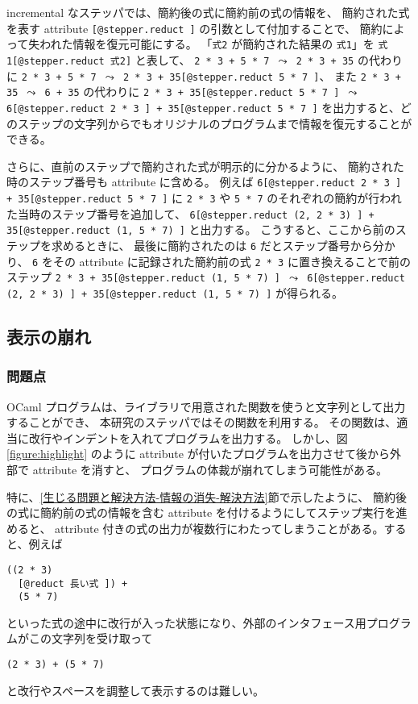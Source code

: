 incremental なステッパでは、簡約後の式に簡約前の式の情報を、
簡約された式を表す attribute \texttt{[@stepper.reduct ]} の引数として付加することで、
簡約によって失われた情報を復元可能にする。
「\texttt{式2} が簡約された結果の \texttt{式1}」を
\texttt{式1[@stepper.reduct 式2]} と表して、
\texttt{2 * 3 + 5 * 7 $\leadsto$ 2 * 3 + 35} の代わりに
\texttt{2 * 3 + 5 * 7 $\leadsto$ 2 * 3 + 35[@stepper.reduct 5 * 7 ]}、
また \texttt{2 * 3 + 35 $\leadsto$ 6 + 35} の代わりに
\texttt{2 * 3 + 35[@stepper.reduct 5 * 7 ] $\leadsto$ 6[@stepper.reduct 2 * 3 ] + 35[@stepper.reduct 5 * 7 ]}
を出力すると、どのステップの文字列からでもオリジナルのプログラムまで情報を復元することができる。

さらに、直前のステップで簡約された式が明示的に分かるように、
簡約された時のステップ番号も attribute に含める。
例えば \texttt{6[@stepper.reduct 2 * 3 ] + 35[@stepper.reduct 5 * 7 ]}
に \texttt{2 * 3} や \texttt{5 * 7} のそれぞれの簡約が行われた当時のステップ番号を追加して、
\texttt{6[@stepper.reduct (2, 2 * 3) ] + 35[@stepper.reduct (1, 5 * 7) ]} と出力する。
こうすると、ここから前のステップを求めるときに、
最後に簡約されたのは \texttt{6} だとステップ番号から分かり、
\texttt{6} をその attribute に記録された簡約前の式 \texttt{2 * 3}
に置き換えることで前のステップ
\texttt{2 * 3 + 35[@stepper.reduct (1, 5 * 7) ] $\leadsto$ 6[@stepper.reduct (2, 2 * 3) ] + 35[@stepper.reduct (1, 5 * 7) ]}
が得られる。

\subsection{表示の崩れ}
\label{生じる問題と解決方法-表示の崩れ}
\subsubsection{問題点}
OCaml プログラムは、ライブラリで用意された関数を使うと文字列として出力することができ、
本研究のステッパではその関数を利用する。
その関数は、適当に改行やインデントを入れてプログラムを出力する。
しかし、図\ref{figure:highlight} のように attribute
が付いたプログラムを出力させて後から外部で attribute を消すと、
プログラムの体裁が崩れてしまう可能性がある。

特に、\ref{生じる問題と解決方法-情報の消失-解決方法}節で示したように、
簡約後の式に簡約前の式の情報を含む attribute を付けるようにしてステップ実行を進めると、
attribute 付きの式の出力が複数行にわたってしまうことがある。すると、例えば
\begin{verbatim}
((2 * 3)
  [@reduct 長い式 ]) +
  (5 * 7)
\end{verbatim}
といった式の途中に改行が入った状態になり、外部のインタフェース用プログラムがこの文字列を受け取って
\begin{verbatim}
(2 * 3) + (5 * 7)
\end{verbatim}
と改行やスペースを調整して表示するのは難しい。

